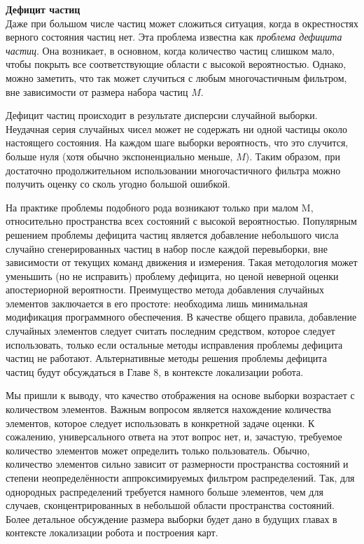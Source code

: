\documentclass[10pt,a4paper]{article}
\begin{document}
\textbf{Дефицит частиц}\\

Даже при большом числе частиц может сложиться ситуация, когда в окрестностях верного состояния частиц нет. Эта проблема известна как \textit{проблема дефицита частиц}. Она возникает, в основном, когда количество частиц слишком мало, чтобы покрыть все соответствующие области с высокой вероятностью. Однако, можно заметить, что так может случиться с любым многочастичным фильтром, вне зависимости от размера набора частиц $M$.
  
Дефицит частиц происходит в результате дисперсии случайной выборки. Неудачная серия случайных чисел может не содержать ни одной частицы около настоящего состояния. На каждом шаге выборки вероятность, что это случится, больше нуля (хотя обычно экспоненциально меньше, $M$). Таким образом,  при достаточно продолжительном использовании многочастичного фильтра можно получить оценку со сколь угодно большой ошибкой.

На практике проблемы подобного рода возникают только при малом M, относительно пространства всех состояний с высокой вероятностью. Популярным решением проблемы дефицита частиц является добавление небольшого числа случайно сгенерированных частиц в набор после каждой перевыборки, вне зависимости от текущих команд движения и измерения. Такая методология может уменьшить (но не исправить) проблему дефицита, но ценой неверной оценки апостериорной вероятности. Преимущество метода добавления случайных элементов заключается в его простоте: необходима лишь минимальная модификация программного обеспечения. 
В качестве общего правила, добавление случайных элементов следует считать последним средством, которое следует использовать, только если остальные методы исправления проблемы дефицита частиц не работают. 
Альтернативные методы решения проблемы дефицита частиц будут обсуждаться в Главе 8, в контексте локализации робота.

Мы пришли к выводу, что качество отображения на основе выборки возрастает с количеством элементов. Важным вопросом является нахождение количества элементов, которое следует использовать в конкретной задаче оценки. К сожалению, универсального ответа на этот вопрос нет, и, зачастую, требуемое количество элементов может определить только пользователь. Обычно, количество элементов сильно зависит от размерности пространства состояний и степени неопределённости аппроксимируемых фильтром распределений. Так, для однородных распределений требуется намного больше элементов, чем для случаев, сконцентрированных в небольшой области пространства состояний. Более детальное обсуждение размера выборки будет дано в будущих главах в контексте локализации робота и построения карт.\\
\end{document}
